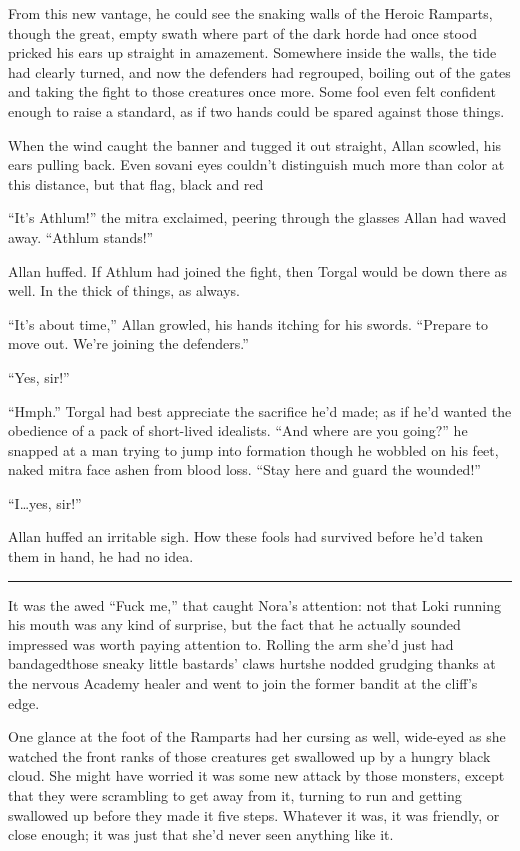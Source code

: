 From this new vantage, he could see the snaking walls of the Heroic Ramparts, though the great, empty swath where part of the dark horde had once stood pricked his ears up straight in amazement. Somewhere inside the walls, the tide had clearly turned, and now the defenders had regrouped, boiling out of the gates and taking the fight to those creatures once more. Some fool even felt confident enough to raise a standard, as if two hands could be spared against those things.

When the wind caught the banner and tugged it out straight, Allan scowled, his ears pulling back. Even sovani eyes couldn't distinguish much more than color at this distance, but that flag, black and red\textemdash 

``It's Athlum!'' the mitra exclaimed, peering through the glasses Allan had waved away. ``Athlum stands!''

Allan huffed. If Athlum had joined the fight, then Torgal would be down there as well. In the thick of things, as always.

``It's about time,'' Allan growled, his hands itching for his swords. ``Prepare to move out. We're joining the defenders.''

``Yes, sir!''

``Hmph.'' Torgal had best appreciate the sacrifice he'd made; as if he'd wanted the obedience of a pack of short-lived idealists. ``And where are you going?'' he snapped at a man trying to jump into formation though he wobbled on his feet, naked mitra face ashen from blood loss. ``Stay here and guard the wounded!''

``I\ldots yes, sir!''

Allan huffed an irritable sigh. How these fools had survived before he'd taken them in hand, he had no idea.

\fancybreak{\pfbreakdisplay}


It was the awed ``Fuck me,'' that caught Nora's attention: not that Loki running his mouth was any kind of surprise, but the fact that he actually sounded impressed was worth paying attention to. Rolling the arm she'd just had bandaged\textemdash those sneaky little bastards' claws hurt\textemdash she nodded grudging thanks at the nervous Academy healer and went to join the former bandit at the cliff's edge.

One glance at the foot of the Ramparts had her cursing as well, wide-eyed as she watched the front ranks of those creatures get swallowed up by a hungry black cloud. She might have worried it was some new attack by those monsters, except that they were scrambling to get away from it, turning to run and getting swallowed up before they made it five steps. Whatever it was, it was friendly, or close enough; it was just that she'd never seen anything like it.

